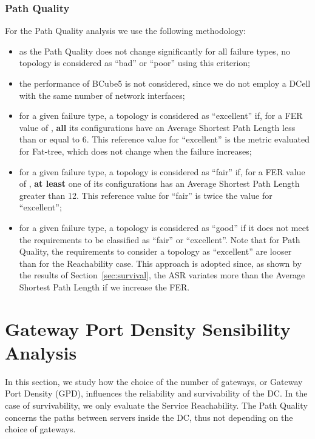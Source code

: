 \subsubsection{Path Quality}

For the Path Quality analysis we use the following methodology:

\begin{itemize}
\item as the Path Quality does not change significantly for all failure types, no topology is considered as ``bad'' or ``poor'' using this criterion;
\item the performance of BCube5 is not considered, since we do not employ a DCell with the same number of network interfaces;
\item for a given failure type, a topology is considered as ``excellent'' if, for a FER value of , \textbf{all} its configurations have an Average Shortest Path Length less than or equal to 6. 
This reference value for ``excellent'' is the metric evaluated for Fat-tree, which does not change when the failure increases;
\item for a given failure type, a topology is considered as ``fair'' if, for a FER value of , \textbf{at least} one of its configurations has an Average Shortest Path Length greater than 12. This reference value for ``fair'' is twice the value for ``excellent'';
\item for a given failure type, a topology is considered as ``good'' if it does not meet the requirements to be classified as ``fair'' or ``excellent''. Note that for Path Quality, the requirements to consider a topology as ``excellent'' are looser than for the Reachability case. This approach is adopted since, as shown by the results of Section~\ref{sec:survival}, the ASR variates more than the Average Shortest Path Length if we increase the FER.
\end{itemize}

\section{Gateway Port Density Sensibility Analysis} 
\label{sec:edpAnalysis}

In this section, we study how the choice of the number of gateways, or Gateway Port Density (GPD), influences the reliability and survivability of the DC.
In the case of survivability, we only evaluate the Service Reachability. The Path Quality concerns the paths between servers inside the DC, thus not depending on the choice of gateways. 

